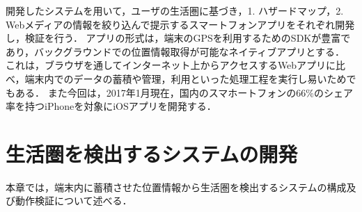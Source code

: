 \documentclass[a4paper]{jsarticle}
\begin{document}
開発したシステムを用いて，ユーザの生活圏に基づき，1. ハザードマップ，2. Webメディアの情報を絞り込んで提示するスマートフォンアプリをそれぞれ開発し，検証を行う．
アプリの形式は，端末のGPSを利用するためのSDKが豊富であり，バックグラウンドでの位置情報取得が可能なネイティブアプリとする．
これは，ブラウザを通してインターネット上からアクセスするWebアプリに比べ，端末内でのデータの蓄積や管理，利用といった処理工程を実行し易いためでもある．
また今回は，2017年1月現在，国内のスマホートフォンの66\%のシェア率を持つiPhoneを対象にiOSアプリを開発する．











\section{生活圏を検出するシステムの開発}
本章では，端末内に蓄積させた位置情報から生活圏を検出するシステムの構成及び動作検証について述べる．
\end{document}
